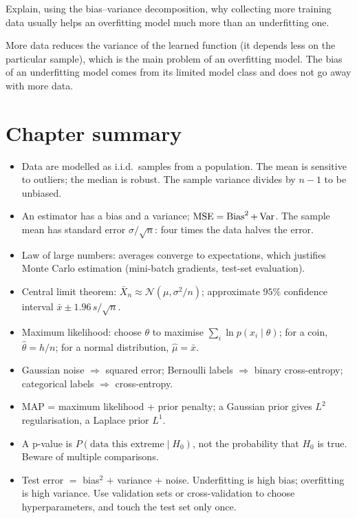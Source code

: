 \begin{exercise}
Explain, using the bias--variance decomposition, why collecting more training data
usually helps an overfitting model much more than an underfitting one.
\end{exercise}
\begin{solution}
More data reduces the variance of the learned function (it depends less on the
particular sample), which is the main problem of an overfitting model. The bias of
an underfitting model comes from its limited model class and does not go away
with more data.
\end{solution}

\section{Chapter summary}\label{sec:ch10-summary}

\begin{keytakeaways}
\begin{itemize}
  \item Data are modelled as i.i.d.\ samples from a population. The mean is
    sensitive to outliers; the median is robust. The sample variance divides by
    $n - 1$ to be unbiased.
  \item An estimator has a bias and a variance; $\operatorname{MSE} = \operatorname{Bias}^2 + \operatorname{Var}$. The
    sample mean has standard error $\sigma/\sqrt n$: four times the data halves
    the error.
  \item Law of large numbers: averages converge to expectations, which justifies
    Monte Carlo estimation (mini-batch gradients, test-set evaluation).
  \item Central limit theorem: $\bar X_n \approx \mathcal{N}(\mu, \sigma^2/n)$;
    approximate $95\%$ confidence interval $\bar x \pm 1.96\,s/\sqrt n$.
  \item Maximum likelihood: choose $\theta$ to maximise
    $\sum_i\ln p(x_i \mid \theta)$; for a coin, $\hat\theta = h/n$; for a normal
    distribution, $\hat\mu = \bar x$.
  \item Gaussian noise $\Rightarrow$ squared error; Bernoulli labels
    $\Rightarrow$ binary cross-entropy; categorical labels $\Rightarrow$
    cross-entropy.
  \item MAP = maximum likelihood + prior penalty; a Gaussian prior gives $L^2$
    regularisation, a Laplace prior $L^1$.
  \item A p-value is $P(\text{data this extreme} \mid H_0)$, not the probability
    that $H_0$ is true. Beware of multiple comparisons.
  \item Test error $=$ bias$^2$ $+$ variance $+$ noise. Underfitting is high
    bias; overfitting is high variance. Use validation sets or cross-validation
    to choose hyperparameters, and touch the test set only once.
\end{itemize}
\end{keytakeaways}

